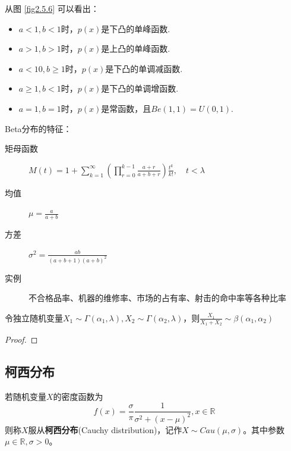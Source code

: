 从图 \ref{fig2.5.6} 可以看出：
\begin{itemize}
    \item $a<1,b<1$时，$p(x)$是下凸的单峰函数.
    \item $a>1,b>1$时，$p(x)$是上凸的单峰函数.
    \item $a<10,b\ge1$时，$p(x)$是下凸的单调减函数.
    \item $a\ge1,b<1$时，$p(x)$是下凸的单调增函数.
    \item $a=1,b=1$时，$p(x)$是常函数，且\underline{$Be(1,1)=U(0,1)$}.
\end{itemize}

Beta分布的特征：
\begin{description}
    \item[矩母函数] $M(t)=1+\sum_{k=1}^{\infty}(\prod_{r=0}^{k-1} \frac{a+r}{a+b+r})\frac{t^k}{k!}, \quad t<\lambda$
    \item[均值] $\mu=\frac{a}{a+b}$
    \item[方差] $\sigma^2=\frac{ab}{(a+b+1)(a+b)^{2}}$
    \item[实例] 不合格品率、机器的维修率、市场的占有率、射击的命中率等各种比率
\end{description}

\begin{proposition}
    令独立随机变量$X_1 \sim \Gamma(\alpha_1,\lambda),X_2 \sim  \Gamma(\alpha_2,\lambda)$，则$\frac{X_1}{X_1+X_2} \sim \beta(\alpha_1,\alpha_2)$
\end{proposition}
\begin{proof}
\end{proof}

\subsection{柯西分布}

\begin{definition}
    若随机变量$X$的密度函数为
    \[ f(x) = \frac{\sigma}{\pi} \frac1{\sigma^2+(x-\mu)^2} ,x \in \mathbb{R} \]
    则称$X$服从\textbf{柯西分布}(Cauchy distribution)，记作$X\sim Cau(\mu,\sigma)$。其中参数$\mu \in \mathbb{R},\sigma>0$。
\end{definition}

